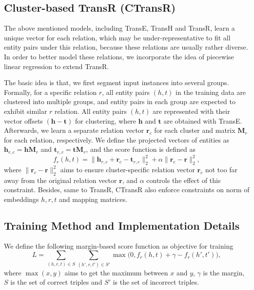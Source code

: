     \subsection{Cluster-based TransR (CTransR)}
    The above mentioned models, including TransE, TransH and TransR, learn a unique vector for each relation, which may be under-representative to fit all entity pairs under this relation, because these relations are usually rather diverse. In order to better model these relations, we incorporate the idea of piecewise linear regression  to extend TransR.

    The basic idea is that, we first segment input instances into several groups. Formally, for a specific relation $r$, all entity pairs $(h, t)$ in the training data are clustered into multiple groups, and entity pairs in each group are expected to exhibit similar $r$ relation. All entity pairs $(h, t)$ are represented with their vector offsets $(\mathbf{h} - \mathbf{t})$ for clustering, where $\mathbf{h}$ and $\mathbf{t}$ are obtained with TransE. Afterwards, we learn a separate relation vector $\mathbf{r}_c$ for each cluster and matrix $\mathbf{M}_{r}$ for each relation, respectively. We define the projected vectors of entities as $\mathbf{h}_{r,c} = \mathbf{h}\mathbf{M}_{r}$ and $\mathbf{t}_{r,c} = \mathbf{t}\mathbf{M}_{r}$, and the score function is defined as
    \begin{equation}
    f_{r}(h, t) = \|\mathbf{h}_{r, c} + \mathbf{r}_c - \mathbf{t}_{r, c}\|_{2}^{2} + \alpha \|\mathbf{r}_{c} - \mathbf{r}\|_{2}^{2},
    \end{equation}
    where $\|\mathbf{r}_{c} - \mathbf{r}\|_{2}^{2}$ aims to ensure cluster-specific relation vector $\mathbf{r}_{c}$ not too far away from the original relation vector $\mathbf{r}$, and $\alpha$ controls the effect of this constraint. Besides, same to TransR, CTransR also enforce constraints on norm of embeddings $h, r, t$ and mapping matrices.

    \subsection{Training Method and Implementation Details}
    We define the following margin-based score function as objective for training
    \begin{equation}
    L = \sum_{(h, r, t) \in S}\sum_{(h', r, t') \in S'}\max \big( 0, f_r(h, t) + \gamma - f_r(h', t')\big),
    \end{equation}
    where $\max(x,y)$ aims to get the maximum between $x$ and $y$, $\gamma$ is the margin, $S$ is the set of correct triples and $S'$ is the set of incorrect triples.

